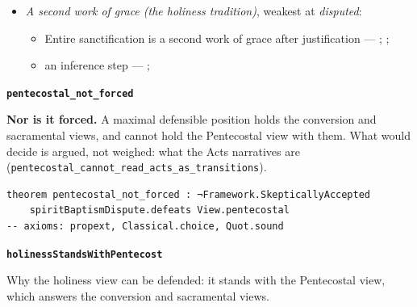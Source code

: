 \documentclass[11pt]{article}
\begin{document}
\begin{itemize}
\begin{itemize}
\item Confirmation gives the full outpouring of the Spirit, as at Pentecost and in Samaria --- \cite[1302]{catholic-church-catechism-2000}; \cite[1288]{catholic-church-catechism-2000}
\item an inference step --- \cite[1302]{catholic-church-catechism-2000}; \cite[XXVIII.6]{westminster-confession-1647}
\item an inference step --- \cite[1302]{catholic-church-catechism-2000}
\end{itemize}
\item \emph{A second work of grace (the holiness tradition)}, weakest at \emph{disputed}:
\begin{itemize}
\item Entire sanctification is a second work of grace after justification --- \cite[Articles of Faith, X, ¶10]{church-of-the-nazarene-manual-2023}; \cite[to Joseph Benson, 28 December 1770]{wesley-letters-1931}; \cite{bassett-white-paper-article-x-2010}
\item an inference step --- \cite[to Joseph Benson, 28 December 1770]{wesley-letters-1931}; \cite{bassett-white-paper-article-x-2010}
\end{itemize}
\end{itemize}
\par\medskip\noindent\textbf{\texttt{pentecostal\_\allowbreak{}not\_\allowbreak{}forced}}\par\nobreak\noindent
\textbf{Nor is it forced.} A maximal defensible position holds the conversion and sacramental views, and cannot hold the Pentecostal view with them. What would decide is argued, not weighed: what the Acts narratives are (\texttt{pentecostal\_\allowbreak{}cannot\_\allowbreak{}read\_\allowbreak{}acts\_\allowbreak{}as\_\allowbreak{}transitions}).

{\small\begin{verbatim}
theorem pentecostal_not_forced : ¬Framework.SkepticallyAccepted
    spiritBaptismDispute.defeats View.pentecostal
-- axioms: propext, Classical.choice, Quot.sound
\end{verbatim}}
\par\medskip\noindent\textbf{\texttt{holiness\allowbreak{}Stands\allowbreak{}With\allowbreak{}Pentecost}}\par\nobreak\noindent
Why the holiness view can be defended: it stands with the Pentecostal view, which answers the conversion and sacramental views.
\end{document}

